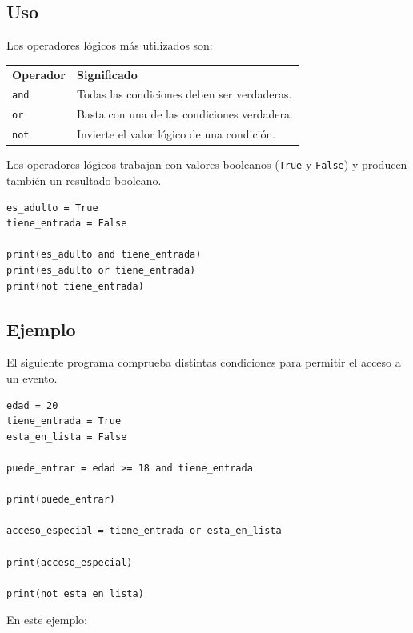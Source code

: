 \documentclass[11pt,a5paper,twoside]{book}
\begin{document}
\subsection{Uso}
Los operadores lógicos más utilizados son:

\newpage

\begin{tcolorbox}
\begin{tabular}{ll}
 \textbf{Operador}  &  \textbf{Significado}                                          \\
 {\scriptsize \texttt{and}}     &  Todas las condiciones deben ser verdaderas.          \\
 {\scriptsize \texttt{or}}      &  Basta con una de las condiciones verdadera.          \\
 {\scriptsize \texttt{not}}     &  Invierte el valor lógico de una condición.           \\
\end{tabular}
\end{tcolorbox}
Los operadores lógicos trabajan con valores booleanos ({\scriptsize \texttt{True}} y {\scriptsize \texttt{False}}) y producen también un resultado booleano.


\begin{tcolorbox}
\scriptsize
 \begin{verbatim}
es_adulto = True
tiene_entrada = False

print(es_adulto and tiene_entrada)
print(es_adulto or tiene_entrada)
print(not tiene_entrada)
\end{verbatim}
\end{tcolorbox}
\subsection{Ejemplo}
El siguiente programa comprueba distintas condiciones para permitir el acceso a un evento.


\begin{tcolorbox}
\scriptsize
 \begin{verbatim}
edad = 20
tiene_entrada = True
esta_en_lista = False

puede_entrar = edad >= 18 and tiene_entrada

print(puede_entrar)

acceso_especial = tiene_entrada or esta_en_lista

print(acceso_especial)

print(not esta_en_lista)
\end{verbatim}
\end{tcolorbox}
En este ejemplo:
\end{document}
